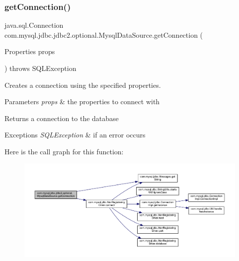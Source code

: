 \subsubsection{\texorpdfstring{get\+Connection()}{getConnection()}\hspace{0.1cm}{\footnotesize\ttfamily [3/3]}}
{\footnotesize\ttfamily java.\+sql.\+Connection com.\+mysql.\+jdbc.\+jdbc2.\+optional.\+Mysql\+Data\+Source.\+get\+Connection (\begin{DoxyParamCaption}\item[{Properties}]{props }\end{DoxyParamCaption}) throws S\+Q\+L\+Exception\hspace{0.3cm}{\ttfamily [protected]}}

Creates a connection using the specified properties.


\begin{DoxyParams}{Parameters}
{\em props} & the properties to connect with\\
\hline
\end{DoxyParams}
\begin{DoxyReturn}{Returns}
a connection to the database
\end{DoxyReturn}

\begin{DoxyExceptions}{Exceptions}
{\em S\+Q\+L\+Exception} & if an error occurs \\
\hline
\end{DoxyExceptions}
Here is the call graph for this function\+:
\nopagebreak
\begin{figure}[H]
\begin{center}
\leavevmode
\includegraphics[width=350pt]{classcom_1_1mysql_1_1jdbc_1_1jdbc2_1_1optional_1_1_mysql_data_source_ad532c3e1663ec177fe6863bd0c8ca47d_cgraph}
\end{center}
\end{figure}
\mbox{\label{classcom_1_1mysql_1_1jdbc_1_1jdbc2_1_1optional_1_1_mysql_data_source_acecf1a115893800067efed693bc8ec15}} 
